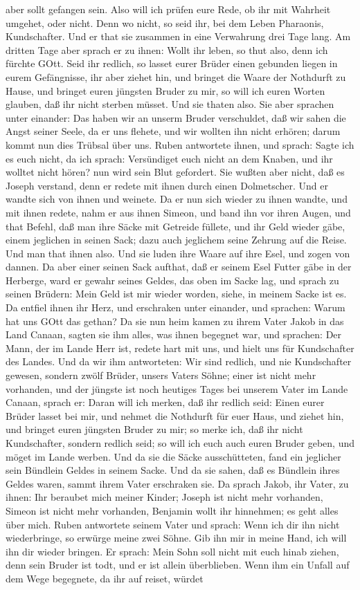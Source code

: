 \begin{schriftzitat}
aber sollt gefangen sein. Also will ich prüfen eure Rede, ob ihr mit Wahrheit umgehet, oder nicht. Denn wo nicht, so seid ihr, bei dem Leben Pharaonis, Kundschafter. Und er that sie zusammen in eine Verwahrung drei Tage lang. Am dritten Tage aber sprach er zu ihnen: Wollt ihr leben, so thut also, denn ich fürchte GOtt. Seid ihr redlich, so lasset eurer Brüder einen gebunden liegen in eurem Gefängnisse, ihr aber ziehet hin, und bringet die Waare der Nothdurft zu Hause, und bringet euren jüngsten Bruder zu mir, so will ich euren Worten glauben, daß ihr nicht sterben müsset. Und sie thaten also. Sie aber sprachen unter einander: Das haben wir an unserm Bruder verschuldet, daß wir sahen die Angst seiner Seele, da er uns flehete, und wir wollten ihn nicht erhören; darum kommt nun dies Trübsal über uns. Ruben antwortete ihnen, und sprach: Sagte ich es euch nicht, da ich sprach: Versündiget euch nicht an dem Knaben, und ihr wolltet nicht hören? nun wird sein Blut gefordert. Sie wußten aber nicht, daß es Joseph verstand, denn er redete mit ihnen durch einen Dolmetscher. Und er wandte sich von ihnen und weinete. Da er nun sich wieder zu ihnen wandte, und mit ihnen redete, nahm er aus ihnen Simeon, und band ihn vor ihren Augen, und that Befehl, daß man ihre Säcke mit Getreide füllete, und ihr Geld wieder gäbe, einem jeglichen in seinen Sack; dazu auch jeglichem seine Zehrung auf die Reise. Und man that ihnen also. Und sie luden ihre Waare auf ihre Esel, und zogen von dannen. Da aber einer seinen Sack aufthat, daß er seinem Esel Futter gäbe in der Herberge, ward er gewahr seines Geldes, das oben im Sacke lag, und sprach zu seinen Brüdern: Mein Geld ist mir wieder worden, siehe, in meinem Sacke ist es. Da entfiel ihnen ihr Herz, und erschraken unter einander, und sprachen: Warum hat uns GOtt das gethan? Da sie nun heim kamen zu ihrem Vater Jakob in das Land Canaan, sagten sie ihm alles, was ihnen begegnet war, und sprachen: Der Mann, der im Lande Herr ist, redete hart mit uns, und hielt uns für Kundschafter des Landes. Und da wir ihm antworteten: Wir sind redlich, und nie Kundschafter gewesen, sondern zwölf Brüder, unsers Vaters Söhne; einer ist nicht mehr vorhanden, und der jüngste ist noch heutiges Tages bei unserem Vater im Lande Canaan, sprach er: Daran will ich merken, daß ihr redlich seid: Einen eurer Brüder lasset bei mir, und nehmet die Nothdurft für euer Haus, und ziehet hin, und bringet euren jüngsten Bruder zu mir; so merke ich, daß ihr nicht Kundschafter, sondern redlich seid; so will ich euch auch euren Bruder geben, und möget im Lande werben. Und da sie die Säcke ausschütteten, fand ein jeglicher sein Bündlein Geldes in seinem Sacke. Und da sie sahen, daß es Bündlein ihres Geldes waren, sammt ihrem Vater erschraken sie. Da sprach Jakob, ihr Vater, zu ihnen: Ihr beraubet mich meiner Kinder; Joseph ist nicht mehr vorhanden, Simeon ist nicht mehr vorhanden, Benjamin wollt ihr hinnehmen; es geht alles über mich. Ruben antwortete seinem Vater und sprach: Wenn ich dir ihn nicht wiederbringe, so erwürge meine zwei Söhne. Gib ihn mir in meine Hand, ich will ihn dir wieder bringen. Er sprach: Mein Sohn soll nicht mit euch hinab ziehen, denn sein Bruder ist todt, und er ist allein überblieben. Wenn ihm ein Unfall auf dem Wege begegnete, da ihr auf reiset, würdet 
\end{schriftzitat}
